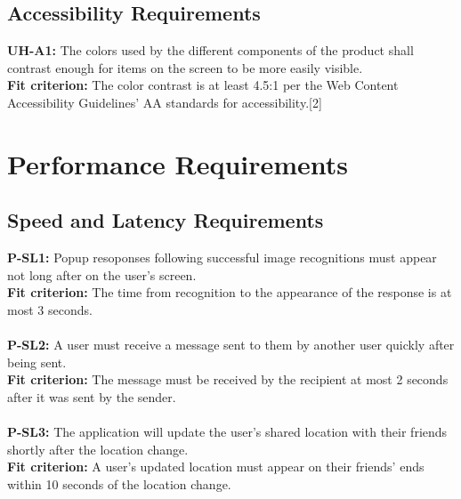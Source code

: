 \documentclass[12pt]{article}
\begin{document}
\subsection{Accessibility Requirements}
  \textbf{UH-A1:} The colors used by the different components of the product shall contrast enough for items on the screen to be more easily visible.\\
  \textbf{Fit criterion:} The color contrast is at least 4.5:1 per the Web Content Accessibility Guidelines’ AA standards for accessibility.[2]\\

\section{Performance Requirements}
\subsection{Speed and Latency Requirements}
  \textbf{P-SL1:} Popup resoponses following successful image recognitions must appear not long after on the user’s screen.\\
  \textbf{Fit criterion:} The time from recognition to the appearance of the response is at most 3 seconds.\\\\
  \textbf{P-SL2:} A user must receive a message sent to them by another user quickly after being sent.\\
  \textbf{Fit criterion:} The message must be received by the recipient at most 2 seconds after it was sent by the sender.\\\\
  \textbf{P-SL3:} The application will update the user’s shared location with their friends shortly after the location change.\\
  \textbf{Fit criterion:} A user’s updated location must appear on their friends’ ends within 10 seconds of the location change.\\
\end{document}
